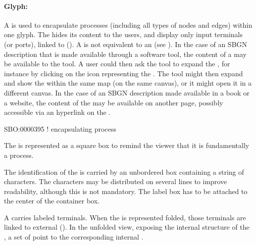 
\paragraph{Glyph: }
\label{sec:submap}

A  is used to encapsulate processes (including all types of nodes and edges) within one glyph.  The  hides its content to the users, and display only input terminals (or ports), linked to  (). A  is not equivalent to an  (see ).  In the case of an SBGN description that is made available through a software tool, the content of a  may be available to the tool.  A user could then ask the tool to expand the , for instance by clicking on the icon representing the .  The tool might then expand and show the  within the same map (on the same canvas), or it might open it in a different canvas. In the case of an SBGN description made available in a book or a website, the content of the  may be available on another page, possibly accessible via an hyperlink on the .

\begin{glyphDescription}

\glyphSboTerm SBO:0000395 ! encapsulating process

\glyphContainer The  is represented as a square box to remind the viewer that it is fundamentally a process.

\glyphLabel The identification of the  is carried by an unbordered box containing a string of characters.  The characters may be distributed on several lines to improve readability, although this is not mandatory.  The label box has to be attached to the center of the container box.

\glyphAux A  carries labeled terminals.  When the  is represented folded, those terminals are linked to external  ().  In the unfolded view, exposing the internal structure of the , a set of  point to the corresponding internal  .

\end{glyphDescription}


